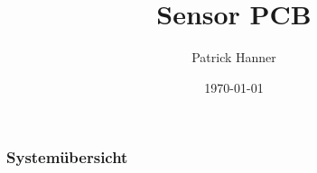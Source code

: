 \documentclass{beamer}
\begin{document}
\title{Sensor PCB}
\author{Patrick Hanner}
\date{\today}

\begin{frame}
    \maketitle
\end{frame}
\begin{frame}
    \frametitle{Systemübersicht}
    
    \begin{figure}
        \begin{tikzpicture}
            
        \end{tikzpicture}
    \end{figure}

\end{frame}
\end{document}
